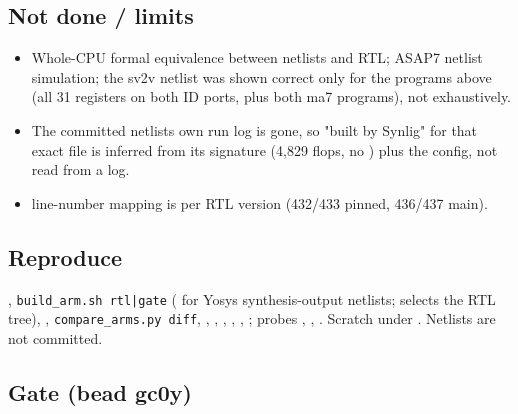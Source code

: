 \subsection{Not done / limits}\label{cr:defect:sky130-cpu-synlig-dud4:not-done-limits}

\begin{record}

\begin{itemize}
\tightlist
\item
  Whole-CPU formal equivalence between netlists and RTL; ASAP7 netlist
  simulation; the sv2v netlist was shown correct only for the programs
  above (all 31 registers on both ID ports, plus both ma7 programs), not
  exhaustively.
\item
  The committed netlist\textquotesingle s own run log is gone, so "built
  by Synlig" for that exact file is inferred from its signature (4,829
  flops, no ) plus the config, not read from a log.
\item
   line-number mapping is per RTL version (432/433
  pinned, 436/437 main).
\end{itemize}

\end{record}

\subsection{Reproduce}\label{cr:defect:sky130-cpu-synlig-dud4:reproduce}

\begin{record}

,
\texttt{build\_\allowbreak{}arm.\allowbreak{}sh\ rtl|gate}
( for Yosys synthesis-output netlists; 
selects the RTL tree), ,
\texttt{compare\_\allowbreak{}arms.\allowbreak{}py\ diff},
, ,
, ,
, ; probes
, , .
Scratch under . Netlists are not
committed.

\end{record}

\subsection{Gate (bead gc0y)}\label{cr:defect:sky130-cpu-synlig-dud4:gate-bead-gc0y}


